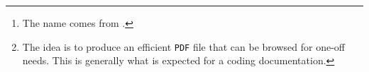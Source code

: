 \begin{abstract}
    The \thisproj{} class\,%
    \footnote{
        The name comes from .
    }
    is used by its author to semantically produce documentation of \LaTeX\ packages and classes in a tutorial style\,%
    \footnote{
        The idea is to produce an efficient \texttt{PDF} file that can be browsed for one-off needs. This is generally what is expected for a coding documentation.
    }
    with a sober rendering for reading on screen.

    \smallskip

    \noindent
    \emph{\textbf{Remark :} this documentation is also available in French.}
\end{abstract}

\tdocsep

